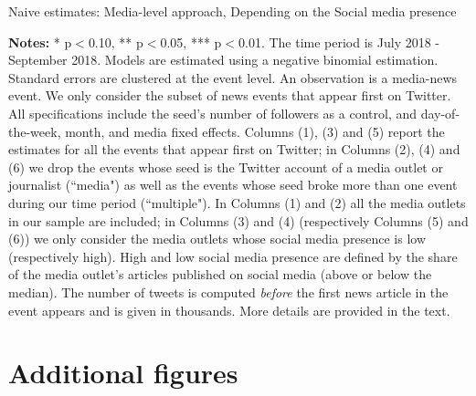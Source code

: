 \clearpage
\pagebreak
\begin{table}
\caption{Naive estimates: Media-level approach, Depending on the Social media presence}
\begin{center}
	
\end{center}
\begin{spacing}{0.5}
	{\fns \textbf{Notes:} * p$<$0.10, ** p$<$0.05, *** p$<$0.01. The time period is July 2018 - September 2018.  Models are estimated using a negative binomial estimation. Standard errors are clustered at the event level. An observation is a media-news event. We only consider the subset of news events that appear first on Twitter. All specifications include the seed's number of followers as a control, and day-of-the-week, month, and media fixed effects. Columns (1), (3) and (5) report the estimates for all the events that appear first on Twitter; in Columns (2), (4) and (6) we drop the events whose seed is the Twitter account of a media outlet or journalist (``media") as well as the events whose seed broke more than one event during our time period (``multiple"). In Columns (1) and (2) all the media outlets in our sample are included; in Columns (3) and (4) (respectively Columns (5) and (6)) we only consider the media outlets whose social media presence is low (respectively high). High and low social media presence are defined by the share of the media outlet's articles published on social media (above or below the median). The number of tweets is computed \textit{before} the first news article in the event appears and is given in thousands. More details are provided in the text.} 
\end{spacing}
\label{Tab:number_articles_negbinomial_cevent_socialmediapresence}
\end{table} 




\clearpage 
\pagebreak
\section{Additional figures \label{Sec:AdFigures}}

